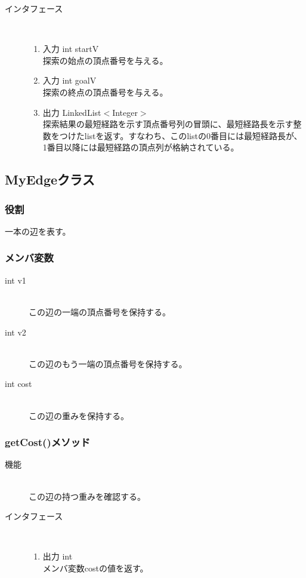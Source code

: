 \documentclass[a4j]{jarticle}
\begin{document}
\begin{description}
\begin{description}
\begin{description}
\item[インタフェース]\
  \begin{enumerate}
  \item 入力 int startV\mbox{}\\
    探索の始点の頂点番号を与える。
  \item 入力 int goalV\mbox{}\\
    探索の終点の頂点番号を与える。
  \item 出力 LinkedList$<$Integer$>$\mbox{}\\
    探索結果の最短経路を示す頂点番号列の冒頭に、最短経路長を示す整数をつけたlistを返す。すなわち、このlistの0番目には最短経路長が、1番目以降には最短経路の頂点列が格納されている。 
  \end{enumerate}
\end{description}
\subsection{MyEdgeクラス}

\subsubsection{役割}
一本の辺を表す。

\subsubsection{メンバ変数}
\begin{description}
\item[int v1]~\\
この辺の一端の頂点番号を保持する。
\item[int v2]~\\
この辺のもう一端の頂点番号を保持する。
\item[int cost]~\\
この辺の重みを保持する。
\end{description}

\subsubsection{getCost()メソッド}

\begin{description}
\item[機能]\mbox{}\\
この辺の持つ重みを確認する。

\item[インタフェース]\
  \begin{enumerate}
  \item 出力 int\mbox{}\\
    メンバ変数costの値を返す。
  \end{enumerate}
\end{description}


\end{description}
\end{description}
\end{document}
